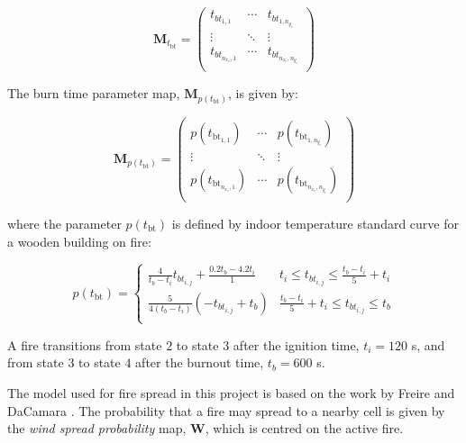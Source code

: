 \documentclass[conference]{IEEEtran}
\begin{document}
\begin{equation} \label{eq:m_t_bt}
\bm{M}_{t_{\text{bt}}} = 
    \begin{pmatrix}
        t_{bt_{1,1}} & \cdots & t_{bt_{1,n_{y_{e}}}}\\
        \vdots & \ddots & \vdots \\
        t_{bt_{n_{x_{e}},1}}& \cdots & t_{bt_{n_{x_{e}},n_{y_{e}}}}\\
    \end{pmatrix}
\end{equation}

The burn time parameter map, $\bm{M}_{p(t_{\text{bt}})}$, is given by:

\begin{equation} \label{eq:m_p_bt}
\bm{M}_{p(t_{\text{bt}})} = 
    \begin{pmatrix}
        p(t_{\text{bt}}_{1,1}) & \cdots & p(t_{\text{bt}_{1,n_{y_{e}}}})\\
        \vdots & \ddots & \vdots \\
        p(t_{\text{bt}}_{n_{x_{e}},1}) & \cdots & p(t_{\text{bt}}_{n_{x_{e}},n_{y_{e}}})\\
    \end{pmatrix}
\end{equation}

where the parameter $p(t_{\text{bt}})$ is defined by indoor temperature standard curve for a wooden building on fire:

\begin{equation}
    p(t_{\text{bt}}) = 
    \begin{cases} 
        \frac{4}{t_{b} - t_{i}} t_{bt_{i,j}} + \frac{0.2 t_{b} - 4.2 t_{i}}{{1}} & t_{i} \leq t_{bt_{i,j}} \leq \frac{t_{b} - t_{i}}{5} + t_{i} \\
        \frac{5}{4 (t_{b} - t_{i}) } (-t_{bt_{i,j}} + t_{b} ) & \frac{t_{b} - t_{i}}{5} + t_{i} \leq t_{bt_{i,j}} \leq t_{b} \\
    \end{cases}
\end{equation}

A fire transitions from state $2$ to state $3$ after the ignition time, $t_{i} = 120$ \si{\second}, and from state $3$ to state $4$ after the burnout time, $t_{b} = 600$ \si{\second}.

The model used for fire spread in this project is based on the work by Freire and DaCamara \cite{freire2019using}.
The probability that a fire may spread to a nearby cell is given by the \textit{wind spread probability} map, $\bm{W}$, which is centred on the active fire.
\end{document}
